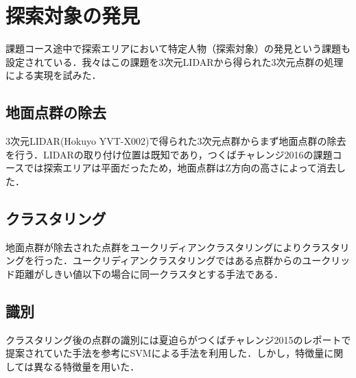 \documentclass[10pt,a4paper]{jarticle}
\begin{document}

\section{探索対象の発見}
課題コース途中で探索エリアにおいて特定人物（探索対象）の発見という課題も設定されている．我々はこの課題を3次元LIDARから得られた3次元点群の処理による実現を試みた．

\subsection{地面点群の除去}
3次元LIDAR(Hokuyo YVT-X002)で得られた3次元点群からまず地面点群の除去を行う．LIDARの取り付け位置は既知であり，つくばチャレンジ2016の課題コースでは探索エリアは平面だったため，地面点群はZ方向の高さによって消去した．
\subsection{クラスタリング}
地面点群が除去された点群をユークリディアンクラスタリングによりクラスタリングを行った．ユークリディアンクラスタリングではある点群からのユークリッド距離がしきい値以下の場合に同一クラスタとする手法である．
\subsection{識別}
クラスタリング後の点群の識別には夏迫らがつくばチャレンジ2015のレポートで提案されていた手法を参考にSVMによる手法を利用した．しかし，特徴量に関しては異なる特徴量を用いた．
\end{document}

